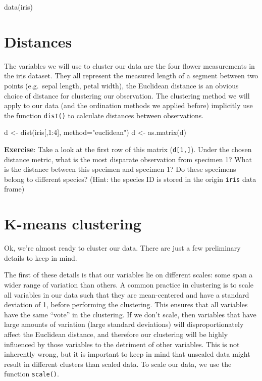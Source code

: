 \documentclass[
]{book}
\newenvironment{Shaded}{\begin{snugshade}}{\end{snugshade}}
\newcommand{\AttributeTok}[1]{\textcolor[rgb]{0.77,0.63,0.00}{#1}}
\newcommand{\DecValTok}[1]{\textcolor[rgb]{0.00,0.00,0.81}{#1}}
\newcommand{\FunctionTok}[1]{\textcolor[rgb]{0.00,0.00,0.00}{#1}}
\newcommand{\NormalTok}[1]{#1}
\newcommand{\OtherTok}[1]{\textcolor[rgb]{0.56,0.35,0.01}{#1}}
\newcommand{\SpecialCharTok}[1]{\textcolor[rgb]{0.00,0.00,0.00}{#1}}
\newcommand{\StringTok}[1]{\textcolor[rgb]{0.31,0.60,0.02}{#1}}
\begin{document}
\begin{Shaded}
\begin{Highlighting}[]
\FunctionTok{data}\NormalTok{(iris)}
\end{Highlighting}
\end{Shaded}

\hypertarget{distances}{%
\section{Distances}\label{distances}}

The variables we will use to cluster our data are the four flower measurements in the iris dataset. They all represent the measured length of a segment between two points (e.g.~sepal length, petal width), the Euclidean distance is an obvious choice of distance for clustering our observation. The clustering method we will apply to our data (and the ordination methods we applied before) implicitly use the function \texttt{dist()} to calculate distances between observations.

\begin{Shaded}
\begin{Highlighting}[]
\NormalTok{d }\OtherTok{\textless{}{-}} \FunctionTok{dist}\NormalTok{(iris[,}\DecValTok{1}\SpecialCharTok{:}\DecValTok{4}\NormalTok{], }\AttributeTok{method=}\StringTok{"euclidean"}\NormalTok{)}
\NormalTok{d }\OtherTok{\textless{}{-}} \FunctionTok{as.matrix}\NormalTok{(d)}
\end{Highlighting}
\end{Shaded}

\textbf{Exercise}: Take a look at the first row of this matrix (\texttt{d{[}1,{]}}). Under the chosen distance metric, what is the most disparate observation from specimen 1? What is the distance between this specimen and specimen 1? Do these specimens belong to different species? (Hint: the species ID is stored in the origin \texttt{iris} data frame)

\hypertarget{k-means-clustering}{%
\section{K-means clustering}\label{k-means-clustering}}

Ok, we're almost ready to cluster our data. There are just a few preliminary details to keep in mind.

The first of these details is that our variables lie on different scales: some span a wider range of variation than others. A common practice in clustering is to scale all variables in our data such that they are mean-centered and have a standard deviation of 1, before performing the clustering. This ensures that all variables have the same ``vote'' in the clustering. If we don't scale, then variables that have large amounts of variation (large standard deviations) will disproportionately affect the Euclidean distance, and therefore our clustering will be highly influenced by those variables to the detriment of other variables. This is not inherently wrong, but it is important to keep in mind that unscaled data might result in different clusters than scaled data. To scale our data, we use the function \texttt{scale()}.
\end{document}

